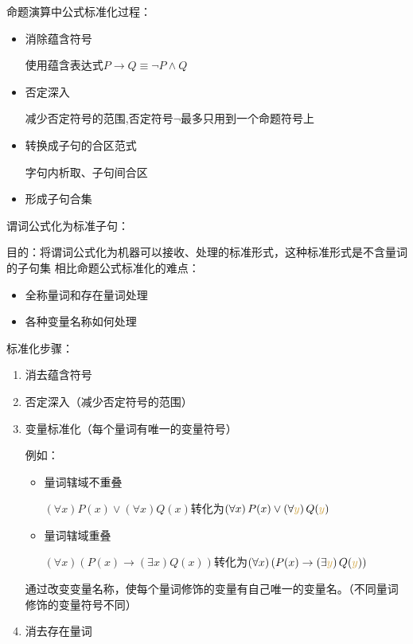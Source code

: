 \begin{note}
    命题演算中公式标准化过程：
    \begin{itemize}
        \item 消除蕴含符号
        
        使用蕴含表达式$P\to Q\equiv \lnot P\land Q$
        \item 否定深入
        
        减少否定符号的范围,否定符号$\lnot$最多只用到一个命题符号上
        \item 转换成子句的合区范式
        
        字句内析取、子句间合区
        \item 形成子句合集
    \end{itemize}
\end{note}
\begin{note}
    谓词公式化为标准子句：

    目的：将谓词公式化为\textcolor{main1}{机器可以接收、处理}的标准形式，这种标准形式是\textcolor{main1}{不含量词的子句集}
    相比命题公式标准化的难点：
    \begin{itemize}
        \item 全称量词和存在量词处理
        \item 各种变量名称如何处理
    \end{itemize}

    \textcolor{main1}{标准化步骤}：
    \begin{enumerate}
        \item 消去蕴含符号
        \item 否定深入（减少否定符号的范围）
        \item \textcolor{main1}{变量标准化（每个量词有唯一的变量符号）}
        
        \textcolor{main1}{例如：}
        \begin{itemize}
            \item 量词辖域不重叠
            
            $\left( \forall x \right)P(x)\lor \left( \forall x \right)Q(x)$转化为$\left( \forall x \right)P(x)\lor \left( \forall \textcolor{main1}{y} \right)Q(\textcolor{main1}{y})$
            \item 量词辖域重叠
            
            $\left( \forall x \right)\left( P(x)\to \left( \exists x \right)Q(x) \right)$转化为$\left( \forall x \right)\left( P(x)\to \left( \exists \textcolor{main1}{y} \right)Q(\textcolor{main1}{y}) \right)$
        \end{itemize}
        通过改变变量名称，使每个量词修饰的变量有自己唯一的变量名。（\textcolor{main1}{不同量词修饰的变量符号不同}）
        \item \textcolor{main1}{消去存在量词}
        

\end{enumerate}
\end{note}
